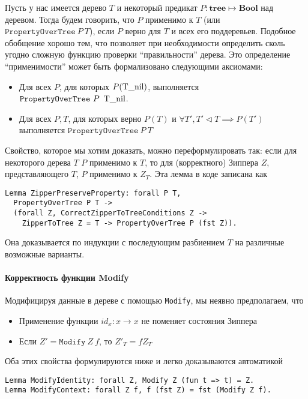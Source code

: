 Пусть у нас имеется дерево $T$ и некоторый предикат $P : \textbf{tree} \mapsto \textbf{Bool}$ над деревом. Тогда будем говорить, что $P$ применимо к $T$ (или $\texttt{PropertyOverTree}\ P\ T$), если $P$ верно для $T$ и всех его поддеревьев. Подобное обобщение хорошо тем, что позволяет при необходимости определить сколь угодно сложную функцию проверки ``правильности'' дерева. Это определение ``применимости'' может быть формализовано следующими аксиомами:

\begin{itemize}
\item Для всех $P$, для которых $P(\operatorname{T\_nil})$, выполняется $\texttt{PropertyOverTree}\ P\ \btnil$.
\item Для всех $P, T$, для которых верно $P(T)$ и $\forall T', T' \triangleleft T \implies P(T')$ выполняется $\texttt{PropertyOverTree}\ P\ T$
\end{itemize}

Свойство, которое мы хотим доказать, можно переформулировать так: если для некоторого дерева $T$ $P$ применимо к $T$, то для (корректного) Зиппера $Z$, представляющего $T$, $P$ применимо к $Z_T$. Эта лемма в коде записана как
\begin{lstlisting}
Lemma ZipperPreserveProperty: forall P T,
  PropertyOverTree P T ->
  (forall Z, CorrectZipperToTreeConditions Z ->
    ZipperToTree Z = T -> PropertyOverTree P (fst Z)).
\end{lstlisting}
Она доказывается по индукции с последующим разбиением $T$ на различные возможные варианты.

\paragraph{Корректность функции Modify}

Модифицируя данные в дереве с помощью \texttt{Modify}, мы неявно предполагаем, что
\begin{itemize}
\item Применение функции $id_x : x \rightarrow x$ не поменяет состояния Зиппера
\item Если $Z' = \texttt{Modify}\ Z\ f$, то $Z'_T = f Z_T$
\end{itemize}

Оба этих свойства формулируются ниже и легко доказываются автоматикой \tcoq
\begin{lstlisting}
Lemma ModifyIdentity: forall Z, Modify Z (fun t => t) = Z.
Lemma ModifyContext: forall Z f, f (fst Z) = fst (Modify Z f).
\end{lstlisting}

